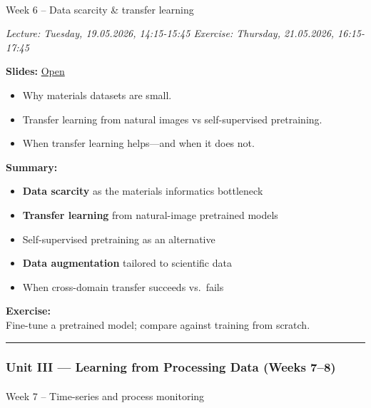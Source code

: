 \documentclass[
]{agujournal2019}
\makeatletter
\let\oldparagraph\paragraph
\renewcommand{\paragraph}{
    \@ifstar
      \xxxParagraphStar
      \xxxParagraphNoStar
  }
\newcommand{\xxxParagraphStar}[1]{\oldparagraph*{#1}\mbox{}}
\newcommand{\xxxParagraphNoStar}[1]{\oldparagraph{#1}\mbox{}}
\providecommand{\tightlist}{%
  \setlength{\itemsep}{0pt}\setlength{\parskip}{0pt}}
\makeatother
\begin{document}
\paragraph{Week 6 -- Data scarcity \& transfer
learning}\label{week-6-data-scarcity-transfer-learning}

\emph{Lecture: Tuesday, 19.05.2026, 14:15-15:45 \textbar{} Exercise:
Thursday, 21.05.2026, 16:15-17:45}

\textbf{Slides:}
\href{https://pelzlab.science/public_presentations/ml_for_characterization_and_processing/unit06_transfer_learning/01_intro.html}{Open}

\begin{itemize}
\tightlist
\item
  Why materials datasets are small.
\item
  Transfer learning from natural images vs self-supervised pretraining.
\item
  When transfer learning helps---and when it does not.
\end{itemize}

\textbf{Summary:}

\begin{itemize}
\tightlist
\item
  \textbf{Data scarcity} as the materials informatics bottleneck
\item
  \textbf{Transfer learning} from natural-image pretrained models
\item
  Self-supervised pretraining as an alternative
\item
  \textbf{Data augmentation} tailored to scientific data
\item
  When cross-domain transfer succeeds vs.~fails
\end{itemize}

\textbf{Exercise:}\\
Fine-tune a pretrained model; compare against training from scratch.

\begin{center}\rule{0.5\linewidth}{0.5pt}\end{center}

\subsubsection{Unit III --- Learning from Processing Data (Weeks
7--8)}\label{unit-iii-learning-from-processing-data-weeks-78}

\paragraph{Week 7 -- Time-series and process
monitoring}\label{week-7-time-series-and-process-monitoring}
\end{document}
